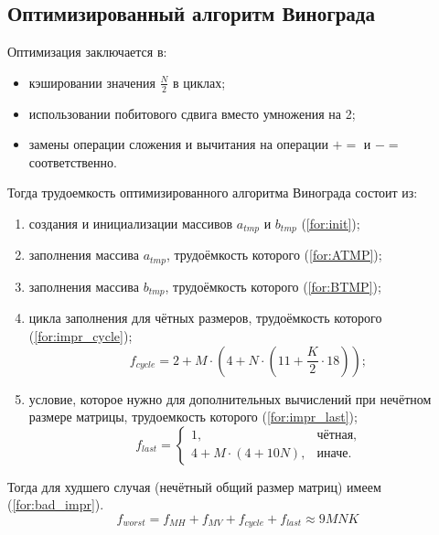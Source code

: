 \subsection{Оптимизированный алгоритм Винограда}

Оптимизация заключается в:
\begin{itemize}[label=---]
	\item кэшировании значения $\frac{N}{2}$ в циклах;
    \item использовании побитового сдвига вместо умножения на 2;
    \item замены операции сложения и вычитания на операции $+=$ и $-=$ соответственно. \newline
\end{itemize}

Тогда трудоемкость оптимизированного алгоритма Винограда состоит из:

\begin{enumerate}[label=\arabic*)]
	\item создания и инициализации массивов $a_{tmp}$ и $b_{tmp}$ (\ref{for:init});

	\item заполнения массива $a_{tmp}$, трудоёмкость которого (\ref{for:ATMP});

	\item заполнения массива  $b_{tmp}$, трудоёмкость которого (\ref{for:BTMP});

	\item цикла заполнения для чётных размеров, трудоёмкость которого (\ref{for:impr_cycle});
	\begin{equation}
		\label{for:impr_cycle}
		f_{cycle} =2 + M \cdot (4 + N \cdot (11 + \frac{K}{2} \cdot 18));
	\end{equation}

	\item условие, которое нужно для дополнительных вычислений при нечётном размере матрицы, трудоемкость которого (\ref{for:impr_last});
	\begin{equation}
		\label{for:impr_last}
		f_{last} =
		\begin{cases}
			1, & \text{чётная,}\\
			4 + M \cdot (4 + 10N), & \text{иначе.}
		\end{cases}
	\end{equation}
\end{enumerate}

Тогда для худшего случая (нечётный общий размер матриц) имеем (\ref{for:bad_impr}).
\begin{equation}
	\label{for:bad_impr}
	f_{worst} = f_{MH} + f_{MV} + f_{cycle} + f_{last} \approx 9MNK
\end{equation}

